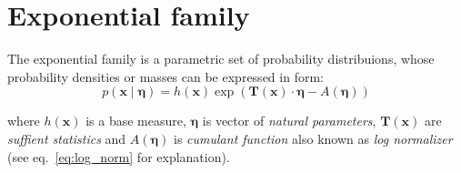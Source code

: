 \section{Exponential family} \label{sec:exp_family}
The exponential family is a parametric set of probability distribuions, whose probability densities or masses can be expressed in form:
\begin{equation}
    p(\boldsymbol{x}\mid \boldsymbol{\eta}) = h(\boldsymbol{x}) \exp( \boldsymbol{T}(\boldsymbol{x}) \cdot \boldsymbol{\eta} - A(\boldsymbol{\eta})) \label{eq:exp-fam}
\end{equation}

where $h(\boldsymbol{x})$ is a base measure, $\boldsymbol{\eta}$ is vector of \textit{natural parameters}, 
$\boldsymbol{T}(\boldsymbol{x})$ are \textit{suffient statistics} and  $A(\boldsymbol{\eta})$ is \textit{cumulant function} 
also known as \textit{log normalizer} (see eq.~\ref{eq:log_norm} for explanation).

